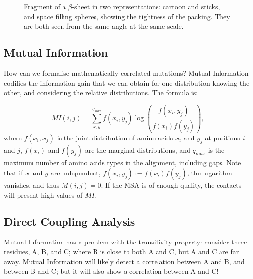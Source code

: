 \begin{figure}[!htb]
	\centering
	\hfil
	\hfil
	\hfil
	\caption{Fragment of a $\beta$-sheet in two representations: cartoon and sticks, and space filling spheres, showing the tightness of the packing.
	They are both seen from the same angle at the same scale.}\label{fig:packing}
\end{figure}


\subsection{Mutual Information}
How can we formalise mathematically correlated mutations?
Mutual Information codifies the information gain that we can obtain for one distribution knowing the other, and considering the relative distributions.
The formula is:

\begin{equation*}
MI\left(i, j\right) = \sum_{x, y}^{q_{max}} f(x_i, y_j) \log \left(\frac{f(x_i, y_j)}{f(x_i)f(y_j)}\right),
\end{equation*}
where $f(x_i, x_j)$ is the joint distribution of amino acids $x_i$ and $y_j$ at positions $i$ and $j$, $f(x_i)$ and $f(y_j)$ are the marginal distributions, and $q_{max}$ is the maximum number of amino acids types in the alignment, including gaps.
Note that if $x$ and $y$ are independent, $f(x_i, y_j) := f(x_i)f(y_j)$, the logarithm vanishes, and thus $M(i, j) = 0$.
If the MSA is of enough quality, the contacts will present high values of $MI$.


\subsection{Direct Coupling Analysis}
Mutual Information has a problem with the transitivity property: consider three residues, A, B, and C; where B is close to both A and C, but A and C are far away.
Mutual Information will likely detect a correlation between A and B, and between B and C; but it will also show a correlation between A and C!

